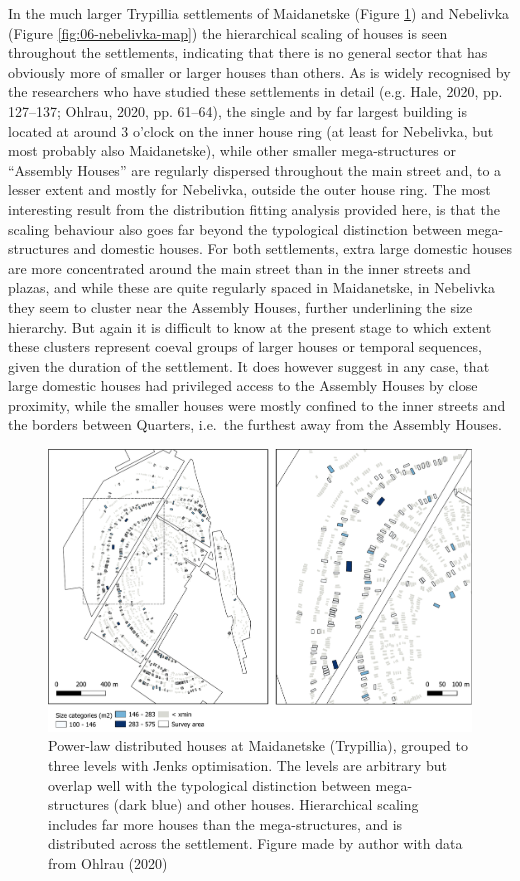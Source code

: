 \documentclass[
  12pt,
]{book}
\begin{document}
In the much larger Trypillia settlements of Maidanetske (Figure \ref{fig:06-maidanetske-map}) and Nebelivka (Figure \ref{fig:06-nebelivka-map}) the hierarchical scaling of houses is seen throughout the settlements, indicating that there is no general sector that has obviously more of smaller or larger houses than others. As is widely recognised by the researchers who have studied these settlements in detail (e.g. Hale, 2020, pp. 127--137; Ohlrau, 2020, pp. 61--64), the single and by far largest building is located at around 3 o'clock on the inner house ring (at least for Nebelivka, but most probably also Maidanetske), while other smaller mega-structures or ``Assembly Houses'' are regularly dispersed throughout the main street and, to a lesser extent and mostly for Nebelivka, outside the outer house ring. The most interesting result from the distribution fitting analysis provided here, is that the scaling behaviour also goes far beyond the typological distinction between mega-structures and domestic houses. For both settlements, extra large domestic houses are more concentrated around the main street than in the inner streets and plazas, and while these are quite regularly spaced in Maidanetske, in Nebelivka they seem to cluster near the Assembly Houses, further underlining the size hierarchy. But again it is difficult to know at the present stage to which extent these clusters represent coeval groups of larger houses or temporal sequences, given the duration of the settlement. It does however suggest in any case, that large domestic houses had privileged access to the Assembly Houses by close proximity, while the smaller houses were mostly confined to the inner streets and the borders between Quarters, i.e.~the furthest away from the Assembly Houses.

\begin{figure}
\hypertarget{fig:06-maidanetske-map}{%
\centering
\includegraphics{Results/fig06_maidanetske_pl.pdf}
\caption{Power-law distributed houses at Maidanetske (Trypillia), grouped to three levels with Jenks optimisation. The levels are arbitrary but overlap well with the typological distinction between mega-structures (dark blue) and other houses. Hierarchical scaling includes far more houses than the mega-structures, and is distributed across the settlement. Figure made by author with data from Ohlrau (2020)}\label{fig:06-maidanetske-map}
}
\end{figure}
\end{document}
